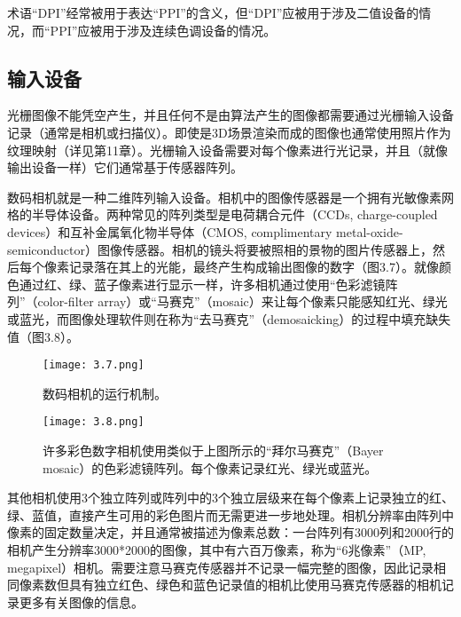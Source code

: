 \documentclass[lang=cn,12pt]{elegantbook}
\begin{document}
\begin{note}
  术语“DPI”经常被用于表达“PPI”的含义，但“DPI”应被用于涉及二值设备的情况，而“PPI”应被用于涉及连续色调设备的情况。
\end{note}

\subsection{输入设备}

光栅图像不能凭空产生，并且任何不是由算法产生的图像都需要通过光栅输入设备记录（通常是相机或扫描仪）。即使是3D场景渲染而成的图像也通常使用照片作为纹理映射（详见第11章）。光栅输入设备需要对每个像素进行光记录，并且（就像输出设备一样）它们通常基于传感器阵列。

数码相机就是一种二维阵列输入设备。相机中的图像传感器是一个拥有光敏像素网格的半导体设备。两种常见的阵列类型是电荷耦合元件（CCDs, charge-coupled devices）和互补金属氧化物半导体（CMOS, complimentary metal-oxide-semiconductor）图像传感器。相机的镜头将要被照相的景物的图片传感器上，然后每个像素记录落在其上的光能，最终产生构成输出图像的数字（图3.7）。就像颜色通过红、绿、蓝子像素进行显示一样，许多相机通过使用“色彩滤镜阵列”（color-filter array）或“马赛克”（mosaic）来让每个像素只能感知红光、绿光或蓝光，而图像处理软件则在称为“去马赛克”（demosaicking）的过程中填充缺失值（图3.8）。

\begin{figure}[htb]
  \centering
  \begin{minipage}[t]{0.45\textwidth}
    \centering
    \texttt{[image: 3.7.png]}
    \caption{数码相机的运行机制。}
  \end{minipage}
  \begin{minipage}[t]{0.45\textwidth}
    \centering
    \texttt{[image: 3.8.png]}
    \caption{许多彩色数字相机使用类似于上图所示的“拜尔马赛克”（Bayer mosaic）的色彩滤镜阵列。每个像素记录红光、绿光或蓝光。}
  \end{minipage}
\end{figure}

其他相机使用3个独立阵列或阵列中的3个独立层级来在每个像素上记录独立的红、绿、蓝值，直接产生可用的彩色图片而无需更进一步地处理。相机分辨率由阵列中像素的固定数量决定，并且通常被描述为像素总数：一台阵列有3000列和2000行的相机产生分辨率3000*2000的图像，其中有六百万像素，称为“6兆像素”（MP, megapixel）相机。需要注意马赛克传感器并不记录一幅完整的图像，因此记录相同像素数但具有独立红色、绿色和蓝色记录值的相机比使用马赛克传感器的相机记录更多有关图像的信息。
\end{document}
